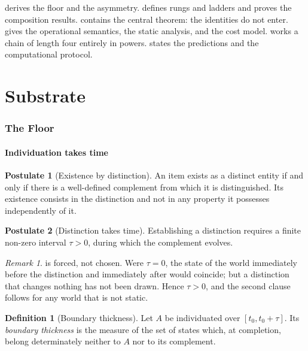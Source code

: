 \documentclass[11pt,twocolumn,a4paper]{article}
\theoremstyle{plain}
\theoremstyle{definition}
\newtheorem{definition}[theorem]{Definition}
\newtheorem{postulate}{Postulate}
\theoremstyle{remark}
\newtheorem{remark}[theorem]{Remark}
\begin{document}
 derives the floor and the asymmetry.
 defines rungs and ladders and proves the composition
results.  contains the central theorem: the identities do
not enter.  gives the operational semantics, the static
analysis, and the cost model.  works a chain of length four
entirely in powers.  states the predictions and the
computational protocol.

\part{Substrate}
\label{part:substrate}

\section{The Floor}
\label{sec:floor}

\subsection{Individuation takes time}

\begin{postulate}[Existence by distinction]
\label{post:negation}
An item exists as a distinct entity if and only if there is a well-defined
complement from which it is distinguished. Its existence consists in the
distinction and not in any property it possesses independently of it.
\end{postulate}

\begin{postulate}[Distinction takes time]
\label{post:duration}
Establishing a distinction requires a finite non-zero interval $\tau > 0$,
during which the complement evolves.
\end{postulate}

\begin{remark}
 is forced, not chosen. Were $\tau = 0$, the state of the
world immediately before the distinction and immediately after would coincide;
but a distinction that changes nothing has not been drawn. Hence $\tau > 0$, and
the second clause follows for any world that is not static.
\end{remark}

\begin{definition}[Boundary thickness]
\label{def:thickness}
Let $A$ be individuated over $[t_0, t_0+\tau]$. Its \emph{boundary thickness} is
the measure of the set of states which, at completion, belong determinately
neither to $A$ nor to its complement.
\end{definition}
\end{document}

